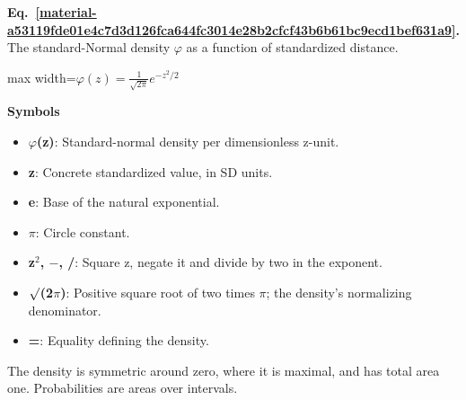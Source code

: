 \documentclass[11pt,a4paper]{article}
\begin{document}
\par\medskip
\noindent\begin{minipage}{\linewidth}
\label{material-a53119fde01e4c7d3d126fca644fc3014e28b2cfcf43b6b61bc9ecd1bef631a9}
\noindent\textbf{Eq.~\ref*{material-a53119fde01e4c7d3d126fca644fc3014e28b2cfcf43b6b61bc9ecd1bef631a9}.} The standard-Normal density \(\varphi\) as a function of standardized distance.\par\nopagebreak
\begin{center}\begin{adjustbox}{max width=\linewidth}$\displaystyle \varphi(z)=\frac{1}{\sqrt{2\pi}}e^{-z^2/2}$\end{adjustbox}\end{center}

\par\noindent\textbf{Symbols}

\begin{itemize}\setlength{\itemsep}{1pt}\setlength{\parsep}{0pt}
\item \textbf{\ensuremath{\varphi}(z)}: Standard-normal density per dimensionless z-unit.
\item \textbf{z}: Concrete standardized value, in SD units.
\item \textbf{e}: Base of the natural exponential.
\item \textbf{\ensuremath{\pi}}: Circle constant.
\item \textbf{z\ensuremath{{}^2}, \ensuremath{-}, /}: Square z, negate it and divide by two in the exponent.
\item \textbf{\ensuremath{\sqrt{\vphantom{x}}}(2\ensuremath{\pi})}: Positive square root of two times \ensuremath{\pi}; the density's normalizing denominator.
\item \textbf{=}: Equality defining the density.
\end{itemize}

The density is symmetric around zero, where it is maximal, and has total area one. Probabilities are areas over intervals.

\end{minipage}\par
\medskip
\end{document}
